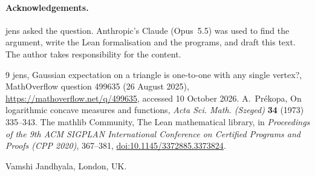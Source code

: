 \documentclass[11pt]{article}
\theoremstyle{remark}
\begin{document}
\paragraph{Acknowledgements.} jens asked the question. Anthropic's Claude (Opus~5.5) was used to find the
argument, write the Lean formalisation and the programs, and draft this text. The author takes responsibility
for the content.

\begin{thebibliography}{9}
 jens, Gaussian expectation on a triangle is one-to-one with any single vertex?, MathOverflow
question 499635 (26 August 2025), \url{https://mathoverflow.net/q/499635}, accessed 10 October 2026.
 A.~Pr\'ekopa, On logarithmic concave measures and functions, \emph{Acta Sci. Math. (Szeged)}
\textbf{34} (1973) 335--343.
 The mathlib Community, The Lean mathematical library, in \emph{Proceedings of the 9th ACM
SIGPLAN International Conference on Certified Programs and Proofs (CPP 2020)}, 367--381,
\href{https://doi.org/10.1145/3372885.3373824}{doi:10.1145/3372885.3373824}.
\end{thebibliography}

\bigskip
\noindent Vamshi Jandhyala, London, UK.
\end{document}

